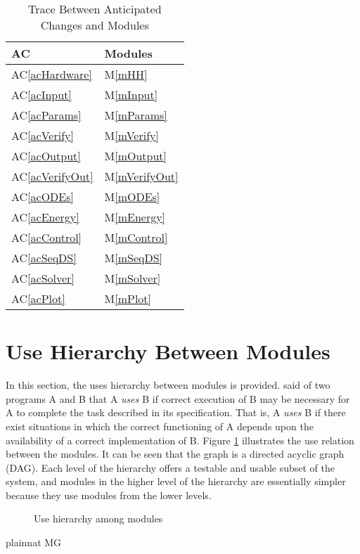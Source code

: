\documentclass[12pt, titlepage]{article}
\newcommand{\acref}[1]{AC\ref{#1}}
\newcommand{\mref}[1]{M\ref{#1}}
\begin{document}
\begin{table}[H]
\centering
\begin{tabular}{p{} p{}}
\toprule
\textbf{AC} & \textbf{Modules}\\
\midrule
\acref{acHardware} & \mref{mHH}\\
\acref{acInput} & \mref{mInput}\\
\acref{acParams} & \mref{mParams}\\
\acref{acVerify} & \mref{mVerify}\\
\acref{acOutput} & \mref{mOutput}\\
\acref{acVerifyOut} & \mref{mVerifyOut}\\
\acref{acODEs} & \mref{mODEs}\\
\acref{acEnergy} & \mref{mEnergy}\\
\acref{acControl} & \mref{mControl}\\
\acref{acSeqDS} & \mref{mSeqDS}\\
\acref{acSolver} & \mref{mSolver}\\
\acref{acPlot} & \mref{mPlot}\\
\bottomrule
\end{tabular}
\caption{Trace Between Anticipated Changes and Modules}
\label{TblACT}
\end{table}


\section{Use Hierarchy Between Modules} \label{SecUse}

In this section, the uses hierarchy between modules is
provided. \citet{Parnas1978} said of two programs A and B that A {\em uses} B if
correct execution of B may be necessary for A to complete the task described in
its specification. That is, A {\em uses} B if there exist situations in which
the correct functioning of A depends upon the availability of a correct
implementation of B.  Figure \ref{FigUH} illustrates the use relation between
the modules. It can be seen that the graph is a directed acyclic graph
(DAG). Each level of the hierarchy offers a testable and usable subset of the
system, and modules in the higher level of the hierarchy are essentially simpler
because they use modules from the lower levels.

\begin{figure}[H]
\centering
\caption{Use hierarchy among modules}
\label{FigUH}
\end{figure}


 {plainnat}
 {MG}
\end{document}
